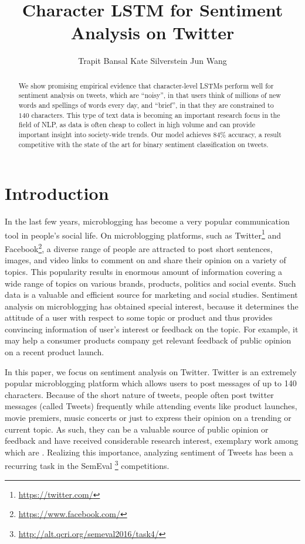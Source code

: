 \documentclass{article} %
\title{Character LSTM for Sentiment Analysis on Twitter}
\author{
Trapit Bansal
\And
Kate Silverstein
\And
Jun Wang
}
\begin{document}
\maketitle

\begin{abstract}
We show promising empirical evidence that character-level LSTMs perform well for sentiment analysis on tweets, which are ``noisy'', in that users think of millions of new words and spellings of words every day, and ``brief'', in that they are constrained to $140$ characters. This type of text data is becoming an important research focus in the field of NLP, as data is often cheap to collect in high volume and can provide important insight into society-wide trends. Our model achieves $84 \%$ accuracy, a result competitive with the state of the art for binary sentiment classification on tweets.
\end{abstract}

\section{Introduction}
In the last few years, microblogging has become a very popular communication tool in people's social life.
On microblogging platforms, such as Twitter\footnote{\url{https://twitter.com/}} and Facebook\footnote{\url{https://www.facebook.com/}}, a diverse range of people are attracted to post short sentences, images, and video links to comment on and share their opinion on a variety of topics.
This popularity results in enormous amount of information covering a wide range of topics on various brands, products, politics and social events. 
Such data is a valuable and efficient source for marketing and social studies. 
Sentiment analysis on microblogging has obtained special interest, because it determines the attitude of a user with respect to some topic or product and thus provides convincing information of user's interest or feedback on the topic.
For example, it may help a consumer products company get relevant feedback of public opinion on a recent product launch.  

In this paper, we focus on sentiment analysis on Twitter. 
Twitter is an extremely popular microblogging platform which allows users to post messages of up to 140 characters.
Because of the short nature of tweets, people often post twitter messages (called Tweets) frequently while attending events like product launches, movie premiers, music concerts or just to express their opinion on a trending or current topic.
As such, they can be a valuable source of public opinion or feedback and have received considerable research interest, exemplary work among which are \cite{o2010tweets, bollen2011twitter, bollen2009modeling}.
Realizing this importance, analyzing sentiment of Tweets has been a recurring task in the SemEval \footnote{\url{http://alt.qcri.org/semeval2016/task4/}} competitions.
\end{document}
